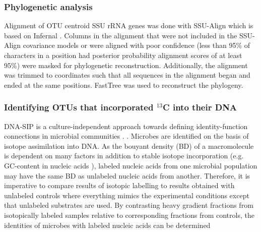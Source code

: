 \subsubsection{Phylogenetic analysis}
Alignment of OTU centroid SSU rRNA genes was done with SSU-Align which is based on Infernal
\citep{Nawrocki_2013,Nawrocki_2009}. Columns in the alignment that were not included in
the SSU-Align covariance models or were aligned with poor confidence (less than
95\% of characters in a position had posterior probability alignment scores of
at least 95\%) were masked for phylogenetic reconstruction. Additionally, the
alignment was trimmed to coordinates such that all sequences in the alignment
began and ended at the same positions. FastTree \citep{Price_2009} was used to
reconstruct the phylogeny.

\subsubsection{Identifying OTUs that incorporated $^{13}$C into their DNA}
DNA-SIP is a culture-independent approach towards defining identity-function
connections in microbial communities \citep{Buckley_2011,Neufeld_2007,Radajewski_2003}. . Microbes are identified on the basis of
isotope assimilation into DNA. As the bouyant density (BD) of a macromolecule is dependent on many factors in addition to stable isotope incorporation (e.g. GC-content in nucleic acids \citep{Youngblut_2014}),
labeled nucleic acids from one microbial population may have the same BD as unlabeled nucleic acids from another. Therefore, it is imperative to compare results of isotopic labelling to results obtained with unlabeled controls where everything mimics the experimental conditions except that unlabeled substrates are used. By contrasting heavy gradient fractions from isotopically labeled samples relative to corresponding fractions from controls, the identities of microbes with labeled nucleic acids can be
determined 

